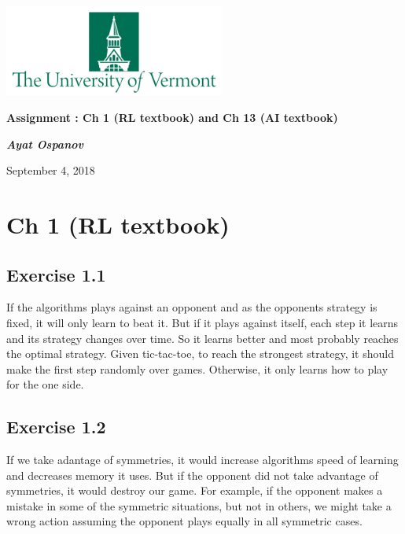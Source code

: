 \documentclass[12pt, a4paper]{article}
\begin{document}
    \begin{singlespace}
    \begin{center}
        \includegraphics[height=3cm]{UVM.png}

        {\large\textbf{Assignment : Ch 1 (RL textbook) and Ch 13 (AI textbook)}}

        \vspace{0.3cm}

        \textit{\textbf{Ayat Ospanov}}

        September 4, 2018
    \end{center}
    \end{singlespace}

    \tableofcontents

    \section{Ch 1 (RL textbook)}

        \subsection{Exercise 1.1}
            If the algorithms plays against an opponent and as the opponents strategy is fixed, it will only learn to beat it. But if it plays against itself, each step it learns and its strategy changes over time. So it learns better and most probably reaches the optimal strategy. Given tic-tac-toe, to reach the strongest strategy, it should make the first step randomly over games. Otherwise, it only learns how to play for the one side.

        \subsection{Exercise 1.2}
            If we take adantage of symmetries, it would increase algorithms speed of learning and decreases memory it uses. But if the opponent did not take advantage of symmetries, it would destroy our game. For example, if the opponent makes a mistake in some of the symmetric situations, but not in others, we might take a wrong action assuming the opponent plays equally in all symmetric cases.
\end{document}
